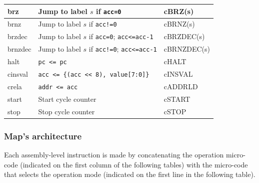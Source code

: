{{\begin{longtable}{|l|l|l|}
brz            & Jump to label \(s\) if \texttt{acc=0}         & cBRZ(s)      \\ \hline
brnz           & Jump to label \(s\) if \texttt{acc!=0}        & cBRNZ(s)     \\ \hline
brzdec         & Jump to label \(s\) if \texttt{acc=0}; \texttt{acc<=acc-1} & cBRZDEC(s)   \\ \hline
brnzdec        & Jump to label \(s\) if \texttt{acc!=0}; \texttt{acc<=acc-1} & cBRNZDEC(s)  \\ \hline
halt           & \texttt{pc <= pc}                            & cHALT        \\ \hline
cinsval        & \texttt{acc <= \{(acc << 8), value[7:0]\}}    & cINSVAL      \\ \hline
crela          & \texttt{addr <= acc}                         & cADDRLD      \\ \hline
start          & Start cycle counter                          & cSTART       \\ \hline
stop           & Stop cycle counter                           & cSTOP        \\ \hline
\end{longtable}
}}



\subsubsection{Map's architecture}

Each assembly-level instruction is made by concatenating the operation micro-code (indicated on the first column of the following tables) with the micro-code that selects the operation mode (indicated on the first line in the following table).

